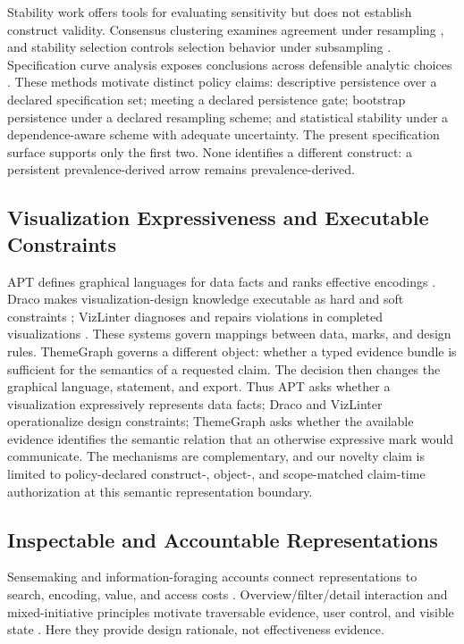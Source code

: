 \documentclass[manuscript,screen,review]{acmart}
\begin{document}
Stability work offers tools for evaluating sensitivity but does not establish construct validity. Consensus clustering examines agreement under resampling \cite{monti2003}, and stability selection controls selection behavior under subsampling \cite{meinshausen2010}. Specification curve analysis exposes conclusions across defensible analytic choices \cite{simonsohn2020}. These methods motivate distinct policy claims: descriptive persistence over a declared specification set; meeting a declared persistence gate; bootstrap persistence under a declared resampling scheme; and statistical stability under a dependence-aware scheme with adequate uncertainty. The present specification surface supports only the first two. None identifies a different construct: a persistent prevalence-derived arrow remains prevalence-derived.

\subsection{Visualization Expressiveness and Executable Constraints}

APT defines graphical languages for data facts and ranks effective encodings \cite{mackinlay1986}. Draco makes visualization-design knowledge executable as hard and soft constraints \cite{moritz2019}; VizLinter diagnoses and repairs violations in completed visualizations \cite{chen2022}. These systems govern mappings between data, marks, and design rules. ThemeGraph governs a different object: whether a typed evidence bundle is sufficient for the semantics of a requested claim. The decision then changes the graphical language, statement, and export. Thus APT asks whether a visualization expressively represents data facts; Draco and VizLinter operationalize design constraints; ThemeGraph asks whether the available evidence identifies the semantic relation that an otherwise expressive mark would communicate. The mechanisms are complementary, and our novelty claim is limited to policy-declared construct-, object-, and scope-matched claim-time authorization at this semantic representation boundary.

\subsection{Inspectable and Accountable Representations}

Sensemaking and information-foraging accounts connect representations to search, encoding, value, and access costs \cite{russell1993,pirolli1999}. Overview/filter/detail interaction and mixed-initiative principles motivate traversable evidence, user control, and visible state \cite{shneiderman1996,horvitz1999}. Here they provide design rationale, not effectiveness evidence.
\end{document}
